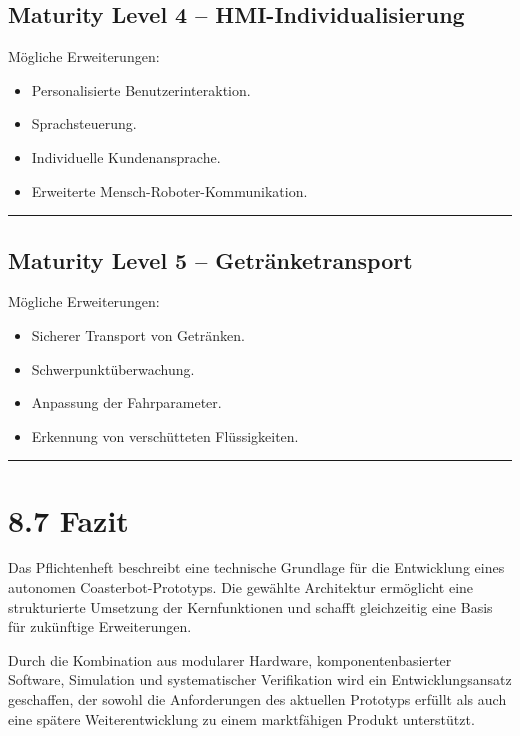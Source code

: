 \documentclass[
  a4paper,
  12pt,
  DIV=12,        %
  parskip=half,  %
  headings=small %
]{scrartcl}
\theoremstyle{definition}
\providecommand{\tightlist}{%
  \setlength{\itemsep}{0pt}\setlength{\parskip}{0pt}}
\theoremstyle{definition}
\providecommand{\tightlist}{%
  \setlength{\itemsep}{0pt}\setlength{\parskip}{0pt}}
\begin{document}
\subsection{Maturity Level 4 --
HMI-Individualisierung}\label{maturity-level-4-hmi-individualisierung}

Mögliche Erweiterungen:

\begin{itemize}
\tightlist
\item
  Personalisierte Benutzerinteraktion.
\item
  Sprachsteuerung.
\item
  Individuelle Kundenansprache.
\item
  Erweiterte Mensch-Roboter-Kommunikation.
\end{itemize}

\begin{center}\rule{0.5\linewidth}{0.5pt}\end{center}

\subsection{Maturity Level 5 --
Getränketransport}\label{maturity-level-5-getruxe4nketransport}

Mögliche Erweiterungen:

\begin{itemize}
\tightlist
\item
  Sicherer Transport von Getränken.
\item
  Schwerpunktüberwachung.
\item
  Anpassung der Fahrparameter.
\item
  Erkennung von verschütteten Flüssigkeiten.
\end{itemize}

\begin{center}\rule{0.5\linewidth}{0.5pt}\end{center}

\section{8.7 Fazit}\label{fazit}

Das Pflichtenheft beschreibt eine technische Grundlage für die
Entwicklung eines autonomen Coasterbot-Prototyps. Die gewählte
Architektur ermöglicht eine strukturierte Umsetzung der Kernfunktionen
und schafft gleichzeitig eine Basis für zukünftige Erweiterungen.

Durch die Kombination aus modularer Hardware, komponentenbasierter
Software, Simulation und systematischer Verifikation wird ein
Entwicklungsansatz geschaffen, der sowohl die Anforderungen des
aktuellen Prototyps erfüllt als auch eine spätere Weiterentwicklung zu
einem marktfähigen Produkt unterstützt.
\end{document}
